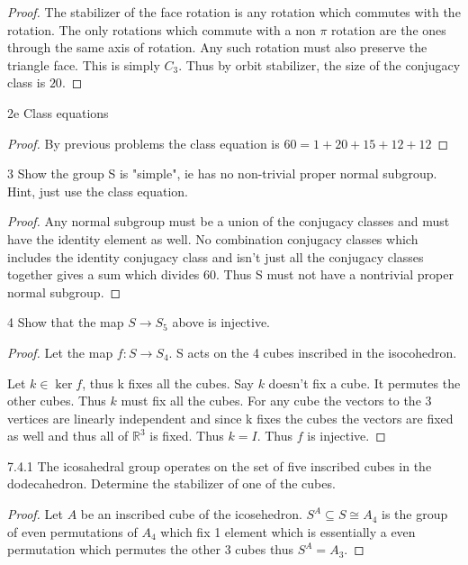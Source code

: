 \documentclass{article}
\newcommand{\R}{\mathbb{R}}
\begin{document}
\begin{proof}
    The stabilizer of the face rotation is any rotation which commutes with the rotation. The only rotations which commute with a non $\pi$ rotation are the ones through the same axis of rotation. Any such rotation must also preserve the triangle face. This is simply $C_3$. Thus by orbit stabilizer, the size of the conjugacy class is $20$.
\end{proof}
\begin{PROB}{2e}\label{Problem 2e.}
    Class equations
\end{PROB}
\begin{proof}
    By previous problems the class equation is $60 = 1 + 20 + 15 + 12 + 12$
\end{proof}

\bigskip

\begin{PROB}{3}\label{Problem 3.}
    Show the group S is "simple", ie has no non-trivial proper normal subgroup. Hint, just use the class equation.
\end{PROB}
\begin{proof}
    Any normal subgroup must be a union of the conjugacy classes and must have the identity element as well. No combination conjugacy classes which includes the identity conjugacy class and isn't just all the conjugacy classes together gives a sum which divides 60. Thus S must not have a nontrivial proper normal subgroup. 
\end{proof}

\bigskip

\begin{PROB}{4}\label{Problem 4.}
    Show that the map $S \to S_5$ above is injective.
\end{PROB}
\begin{proof}
    Let the map $f: S \to S_4$. S acts on the 4 cubes inscribed in the isocohedron. 

    Let $k \in \ker f$, thus k fixes all the cubes.
    Say $k$ doesn't fix a cube. It permutes the other cubes. Thus $k$ must fix all the cubes. For any cube the vectors to the 3 vertices are linearly independent and since k fixes the cubes the vectors are fixed as well and thus all of $\R^3$ is fixed. Thus $k = I$. Thus $f$ is injective.
\end{proof}

\bigskip

\begin{PROB}{7.4.1}\label{Problem 7.4.1.}
    The icosahedral group operates on the set of five inscribed cubes in the dodecahedron. Determine the stabilizer of one of the cubes.
\end{PROB}
\begin{proof}
    Let $A$ be an inscribed cube of the icosehedron. $S^A \subseteq S \cong A_4$ is the group of even permutations of $A_4$ which fix 1 element which is essentially a even permutation which permutes the other 3 cubes thus $S^A = A_3$. 
\end{proof}
\end{document}
